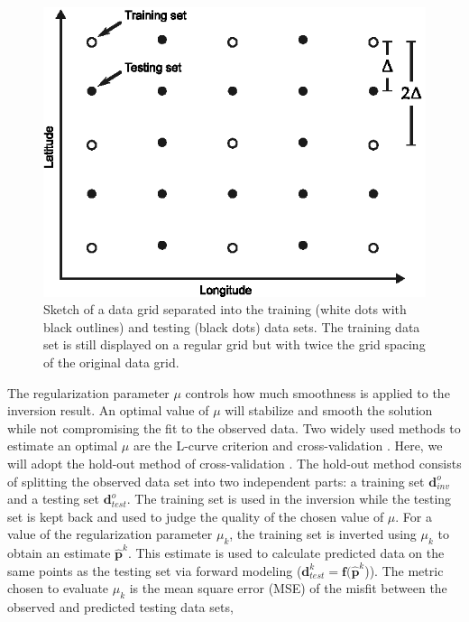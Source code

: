 \begin{figure}
    \centering
    \includegraphics{figures/paper-moho/cv-grid-separation}
    \caption{Sketch of a data grid separated into
        the training (white dots with black outlines)
        and testing (black dots) data sets.
        The training data set is still displayed on a regular grid
        but with twice the grid spacing
        of the original data grid.}
    \label{fig:p3-grid_separation}
\end{figure}

The regularization parameter $\mu$ controls how much smoothness is applied to
the inversion result.
An optimal value of $\mu$ will stabilize and smooth the solution while not
compromising the fit to the observed data.
Two widely used methods to estimate an optimal $\mu$ are
the L-curve criterion and cross-validation \citep{hansen1992}.
Here, we will adopt the hold-out method of cross-validation \citep{kim2009}.
The hold-out method consists of splitting the observed data set into two
independent parts:
a training set $\mathbf{d}^o_{inv}$
and a testing set $\mathbf{d}^o_{test}$.
The training set is used in the inversion
while the testing set is kept back
and used to judge the quality of the chosen value of $\mu$.
For a value of the regularization parameter $\mu_k$,
the training set is inverted using $\mu_k$
to obtain an estimate $\mathbf{\hat{p}}^k$.
This estimate is used to calculate predicted data
on the same points as the testing set
via forward modeling
($\mathbf{d}_{test}^k = \mathbf{f}(\mathbf{\hat{p}}^k$)).
The metric chosen to evaluate $\mu_k$ is
the mean square error (MSE) of the misfit
between the observed and predicted testing data sets,

